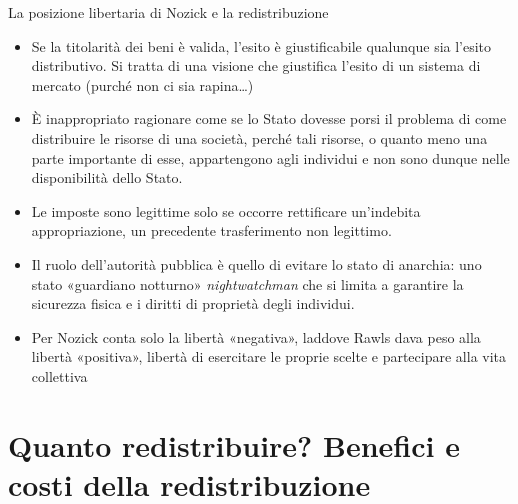 \documentclass[11pt]{beamer}
\begin{document}
\begin{frame}{La posizione libertaria di Nozick e la redistribuzione}
\begin{itemize}
\item Se la titolarità dei beni è valida, l'esito è giustificabile qualunque sia
l'esito distributivo. Si tratta di una visione che giustifica l'esito di un
sistema di mercato (purché non ci sia rapina\ldots{})
\item È inappropriato ragionare come se lo Stato dovesse porsi il problema di come
distribuire le risorse di una società, perché tali risorse, o quanto meno
una parte importante di esse, appartengono agli individui e non sono dunque
nelle disponibilità dello Stato.
\item Le imposte sono legittime solo se occorre rettificare un'indebita
appropriazione, un precedente trasferimento non legittimo.
\item Il ruolo dell'autorità pubblica è quello di evitare lo stato di anarchia:
uno stato «guardiano notturno» \emph{nightwatchman} che si limita a garantire la
sicurezza fisica e i diritti di proprietà degli individui.
\item Per Nozick conta solo la libertà «negativa», laddove Rawls dava peso alla
libertà «positiva», libertà di esercitare le proprie scelte e partecipare
alla vita collettiva
\end{itemize}
\end{frame}

\section{Quanto redistribuire? Benefici e costi della redistribuzione}
\end{document}
